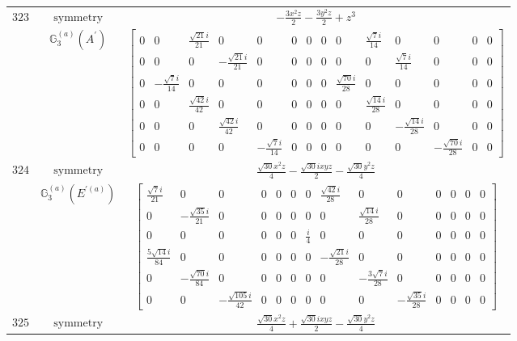\documentclass[fleqn,8pt,landscape]{jsarticle}
\begin{document}
\begin{longtable}{ccc}
$ 323 $ & $ \text{symmetry} $ & $ - \frac{3 x^{2} z}{2} - \frac{3 y^{2} z}{2} + z^{3} $ \\
$  $ & $ \mathbb{G}_{3}^{(a)}(A^{\prime}) $ & $ \begin{bmatrix} 0 & 0 & \frac{\sqrt{21} i}{21} & 0 & 0 & 0 & 0 & 0 & 0 & \frac{\sqrt{7} i}{14} & 0 & 0 & 0 & 0 \\ 0 & 0 & 0 & - \frac{\sqrt{21} i}{21} & 0 & 0 & 0 & 0 & 0 & 0 & \frac{\sqrt{7} i}{14} & 0 & 0 & 0 \\ 0 & - \frac{\sqrt{7} i}{14} & 0 & 0 & 0 & 0 & 0 & 0 & \frac{\sqrt{70} i}{28} & 0 & 0 & 0 & 0 & 0 \\ 0 & 0 & \frac{\sqrt{42} i}{42} & 0 & 0 & 0 & 0 & 0 & 0 & \frac{\sqrt{14} i}{28} & 0 & 0 & 0 & 0 \\ 0 & 0 & 0 & \frac{\sqrt{42} i}{42} & 0 & 0 & 0 & 0 & 0 & 0 & - \frac{\sqrt{14} i}{28} & 0 & 0 & 0 \\ 0 & 0 & 0 & 0 & - \frac{\sqrt{7} i}{14} & 0 & 0 & 0 & 0 & 0 & 0 & - \frac{\sqrt{70} i}{28} & 0 & 0 \end{bmatrix} $ \\ \hline
$ 324 $ & $ \text{symmetry} $ & $ \frac{\sqrt{30} x^{2} z}{4} - \frac{\sqrt{30} i x y z}{2} - \frac{\sqrt{30} y^{2} z}{4} $ \\
$  $ & $ \mathbb{G}_{3}^{(a)}(E^{\prime(a)}) $ & $ \begin{bmatrix} \frac{\sqrt{7} i}{21} & 0 & 0 & 0 & 0 & 0 & 0 & \frac{\sqrt{42} i}{28} & 0 & 0 & 0 & 0 & 0 & 0 \\ 0 & - \frac{\sqrt{35} i}{21} & 0 & 0 & 0 & 0 & 0 & 0 & \frac{\sqrt{14} i}{28} & 0 & 0 & 0 & 0 & 0 \\ 0 & 0 & 0 & 0 & 0 & 0 & \frac{i}{4} & 0 & 0 & 0 & 0 & 0 & 0 & 0 \\ \frac{5 \sqrt{14} i}{84} & 0 & 0 & 0 & 0 & 0 & 0 & - \frac{\sqrt{21} i}{28} & 0 & 0 & 0 & 0 & 0 & 0 \\ 0 & - \frac{\sqrt{70} i}{84} & 0 & 0 & 0 & 0 & 0 & 0 & - \frac{3 \sqrt{7} i}{28} & 0 & 0 & 0 & 0 & 0 \\ 0 & 0 & - \frac{\sqrt{105} i}{42} & 0 & 0 & 0 & 0 & 0 & 0 & - \frac{\sqrt{35} i}{28} & 0 & 0 & 0 & 0 \end{bmatrix} $ \\ \hline
$ 325 $ & $ \text{symmetry} $ & $ \frac{\sqrt{30} x^{2} z}{4} + \frac{\sqrt{30} i x y z}{2} - \frac{\sqrt{30} y^{2} z}{4} $ \\

\end{longtable}
\end{document}
